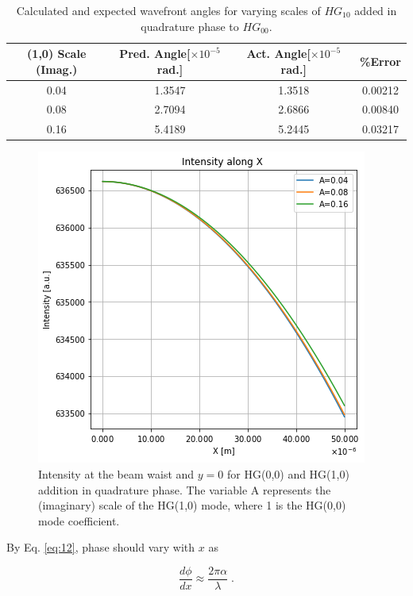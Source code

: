 \documentclass[aps,twoside,secnumarabic,balancelastpage,amsmath,amssymb,nofootinbib,hyperref=pdftex]{revtex4}
\begin{document}
	\begin{center}
	\begin{table}[ht]\label{tab:2}
	 \begin{tabular}{||c c c c||} 
	 \hline
	 (1,0) Scale (Imag.) & Pred. Angle[$\times 10^{-5}$ rad.] & Act. Angle[$\times 10^{-5}$ rad.] & \%Error \\ [0.5ex] 
	 \hline\hline
	 0.04 & 1.3547 & 1.3518 & 0.00212 \\ 
	 \hline
	 0.08 & 2.7094 & 2.6866 & 0.00840 \\
	 \hline
	 0.16 & 5.4189  & 5.2445 & 0.03217 \\ [1ex]
	 \hline
	\end{tabular}
	\caption{Calculated and expected wavefront angles for varying scales of $HG_{10}$ added in quadrature phase to $HG_{00}$.}
	\end{table}
	\end{center}

	\begin{figure}
	\centering
		\includegraphics[scale=.7]{beamtiltint}
		\caption{Intensity at the beam waist and $y=0$ for HG(0,0) and HG(1,0) addition in quadrature phase. The variable A represents the (imaginary) scale of the HG(1,0) mode, where 1 is the HG(0,0) mode coefficient.}
		\label{fig:2}
	\end{figure}
	
By Eq. \ref{eq:12}, phase should vary with $x$ as
	
	\begin{equation}\label{eq:21}
		\frac{d\phi}{dx} \approx \frac{2 \pi \alpha}{\lambda} \; .
	\end{equation}
\end{document}
